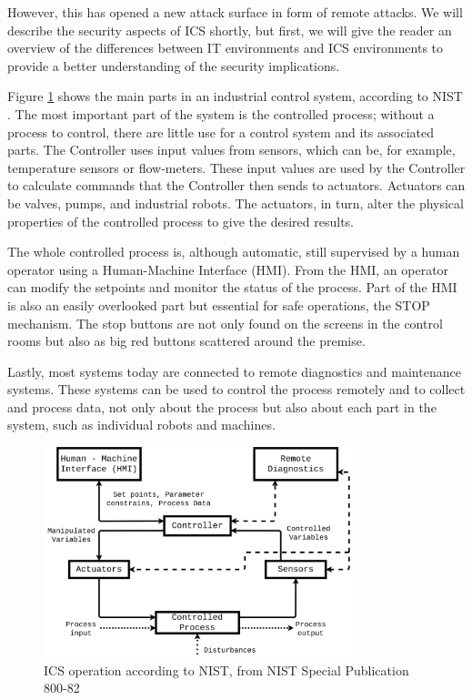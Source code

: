 However, this has opened a new attack surface in form of remote attacks. We will describe the security aspects of ICS shortly, but first, we will give the reader an overview of the differences between IT environments and ICS environments to provide a better understanding of the security implications.


Figure \ref{fig:nist_ics} shows the main parts in an industrial control system, according to NIST  \cite{NISTICS2015}. The most important part of the system is the controlled process; without a process to control, there are little use for a control system and its associated parts. The Controller uses input values from sensors, which can be, for example, temperature sensors or flow-meters. These input values are used by the Controller to calculate commands that the Controller then sends to actuators. Actuators can be valves, pumps, and industrial robots. The actuators, in turn, alter the physical properties of the controlled process to give the desired results. 

The whole controlled process is, although automatic, still supervised by a human operator using a Human-Machine Interface (HMI).
From the HMI, an operator can modify the setpoints and monitor the status of the process. Part of the HMI is also an easily overlooked part but essential for safe operations, the STOP mechanism. The stop buttons are not only found on the screens in the control rooms but also as big red buttons scattered around the premise. 

Lastly, most systems today are connected to remote diagnostics and maintenance systems. These systems can be used to control the process remotely and to collect and process data, not only about the process but also about each part in the system, such as individual robots and machines. 

\begin{figure}[h]
\centering
\includegraphics[width=0.8\textwidth]{images/NIST_800.png}
\caption{ICS operation according to NIST, from NIST Special Publication 800-82}
\label{fig:nist_ics}
\end{figure}

